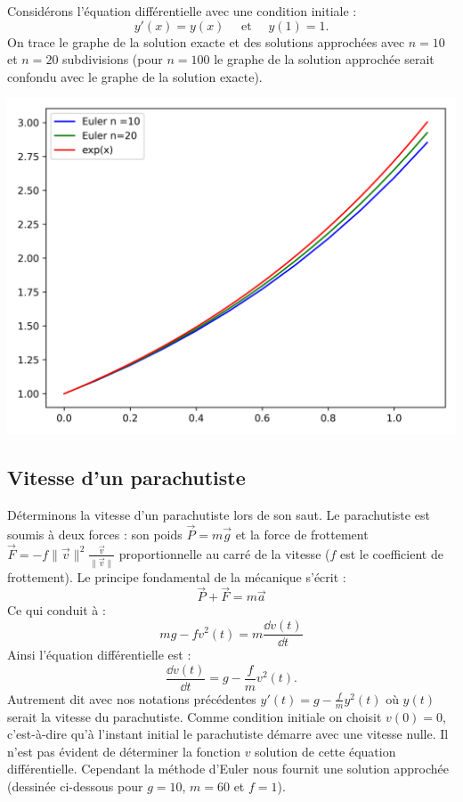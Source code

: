 \documentclass[11pt,class=report,crop=false]{standalone}
\begin{document}
\begin{exemple}
Considérons l'équation différentielle avec une condition initiale :
$$y'(x) = y(x) \quad \text{ et } \quad y(1) = 1.$$
On trace le graphe de la solution exacte et des solutions approchées avec $n=10$ et $n=20$ subdivisions (pour $n=100$ le graphe de la solution approchée serait confondu avec le graphe de la solution exacte).
\begin{center}
  \includegraphics[scale=\myscale,scale=0.6]{figures/equadiff-euler-03}
\end{center}  
\end{exemple}



\subsection{Vitesse d'un parachutiste}

Déterminons la vitesse d'un parachutiste lors de son saut.
Le parachutiste est soumis à deux forces :  son poids $\vec P = m \vec g$ et la force de frottement $\vec F = - f  \| \vec v \|^2 \frac{\vec v}{\| \vec v\|}$
proportionnelle au carré de la vitesse ($f$ est le coefficient de frottement).
Le principe fondamental de la mécanique s'écrit :
$$\vec P  + \vec F = m \vec a$$
Ce qui conduit à :
$$ m g - f v^2(t) = m \frac{\dd v(t)}{\dd t}$$
Ainsi l'équation différentielle est :
$$\frac{\dd v(t)}{\dd t} = g - \frac{f}{m} v^2(t).$$
Autrement dit avec nos notations précédentes $y'(t) = g - \frac{f}{m} y^2(t)$ où $y(t)$ serait la vitesse du parachutiste.
Comme condition initiale on choisit $v(0) = 0$, c'est-à-dire qu'à l'instant initial le parachutiste démarre avec une vitesse nulle.
Il n'est pas évident de déterminer la fonction $v$ solution de cette équation différentielle. Cependant la méthode d'Euler nous fournit une solution approchée (dessinée ci-dessous pour $g=10$, $m=60$ et $f=1$).
\end{document}

